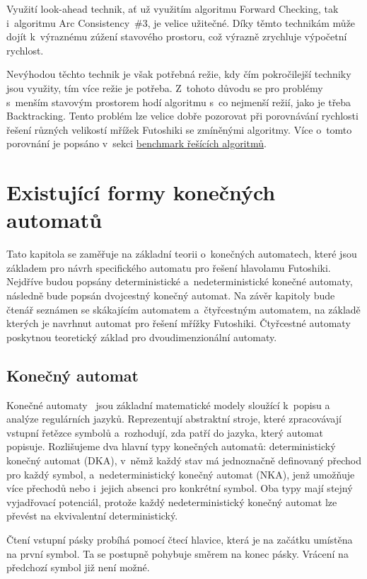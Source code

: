 Využití look-ahead technik, ať už využitím algoritmu Forward Checking, tak
i~algoritmu Arc Consistency~\#3, je velice užitečné. Díky těmto technikám může
dojít k~výraznému zúžení stavového prostoru, což výrazně zrychluje výpočetní
rychlost.

Nevýhodou těchto technik je však potřebná režie, kdy čím pokročilejší techniky
jsou využity, tím více režie je potřeba. Z~tohoto důvodu se pro problémy
s~menším stavovým prostorem hodí algoritmu s~co nejmenší režií, jako je třeba
Backtracking. Tento problém lze velice dobře pozorovat při porovnávání
rychlosti řešení různých velikostí mřížek Futoshiki se zmíněnými algoritmy.
Více o~tomto porovnání je popsáno v~sekci
\hyperref[sec:timeComplexity]{benchmark řešících algoritmů}.

\chapter{Existující formy konečných automatů}

Tato kapitola se zaměřuje na základní teorii o~konečných automatech, které jsou
základem pro návrh specifického automatu pro řešení hlavolamu Futoshiki.
Nejdříve budou popsány deterministické a~nedeterministické konečné automaty,
následně bude popsán dvojcestný konečný automat. Na závěr kapitoly bude čtenář
seznámen se skákajícím automatem a~čtyřcestným automatem, na základě kterých je
navrhnut automat pro řešení mřížky Futoshiki. Čtyřcestné automaty poskytnou
teoretický základ pro dvoudimenzionální automaty.

\section{Konečný automat}

Konečné automaty~\cite{AutomataTheory} jsou základní matematické modely
sloužící k~popisu a analýze regulárních jazyků. Reprezentují abstraktní stroje,
které zpracovávají vstupní řetězce symbolů a~rozhodují, zda patří do jazyka,
který automat popisuje. Rozlišujeme dva hlavní typy konečných automatů:
deterministický konečný automat (DKA), v~němž každý stav má jednoznačně
definovaný přechod pro každý symbol, a~nedeterministický konečný automat (NKA),
jenž umožňuje více přechodů nebo i~jejich absenci pro konkrétní symbol. Oba
typy mají stejný vyjadřovací potenciál, protože každý nedeterministický konečný
automat lze převést na ekvivalentní deterministický.

Čtení vstupní pásky probíhá pomocí čtecí hlavice, která je na začátku umístěna
na první symbol. Ta se postupně pohybuje směrem na konec pásky. Vrácení na
předchozí symbol již není možné.

